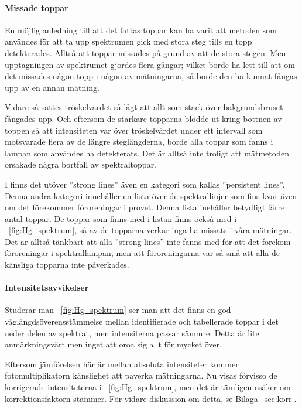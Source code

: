 \documentclass[11pt,a4paper]{article}
\newcommand{\figref}{\figurename~\ref}
\begin{document}
\paragraph{Missade toppar}
En möjlig anledning till att det fattas toppar kan ha varit att
metoden som användes för att ta upp spektrumen gick med stora steg
tills en topp detekterades. Alltså att toppar missades på grund av att
de stora stegen. Men upptagningen av spektrumet gjordes flera
gångar; vilket borde ha lett till att om det missades någon topp i
någon av mätningarna, så borde den ha kunnat fångas upp av en annan
mätning. 

Vidare så sattes tröskelvärdet så lågt att allt som stack över
bakgrundsbruset fångades upp. Och eftersom de starkare topparna blödde
ut kring bottnen av toppen så att intensiteten var över tröskelvärdet
under ett intervall som motsvarade flera av de längre steglängderna,
borde alla toppar som fanns i lampan som användes ha detekterats. Det
är alltså inte troligt att mätmetoden orsakade några bortfall av
spektraltoppar. 

I \cite{NIST_spectrum} finns det utöver ''strong lines'' även en
kategori som kallas ''persistent lines''. Denna andra kategori
innehåller en lista över de spektrallinjer som fins kvar även om det
förekommer föroreningar i provet. Denna lista inehåller betydligt
färre antal toppar. De toppar som finns med i listan\footnotemark{}
finns också med i \figref{fig:Hg_spektrum}, så av de topparna verkar
inga ha missats i våra mätningar. Det är alltså tänkbart att alla
''strong lines'' inte fanns med för att det förekom föroreningar i
spektrallampan, men att föroreningarna var så små att alla de känsliga
topparna inte påverkades. 


\paragraph{Intensitetsavvikelser}
Studerar man \figref{fig:Hg_spektrum} ser man att det finns en god
våglängdsöverensstämmelse mellan identifierade och tabellerade toppar
i det neder delen av spektrat, men intensiterna passar
sämmre. Detta är lite anmärkningsvärt men inget att oroa sig allt för
mycket över.

Eftersom jämförelsen här är mellan absoluta intensiteter kommer
fotomultiplikatorn känslighet att påverka mätningarna. Nu visas
förvisso de korrigerade intensiteterna i \figref{fig:Hg_spektrum}, men
det är tämligen osäker om korrektionsfaktorn stämmer. För vidare
diskussion om detta, se Bilaga~\ref{sec:korr}. 
\end{document}
